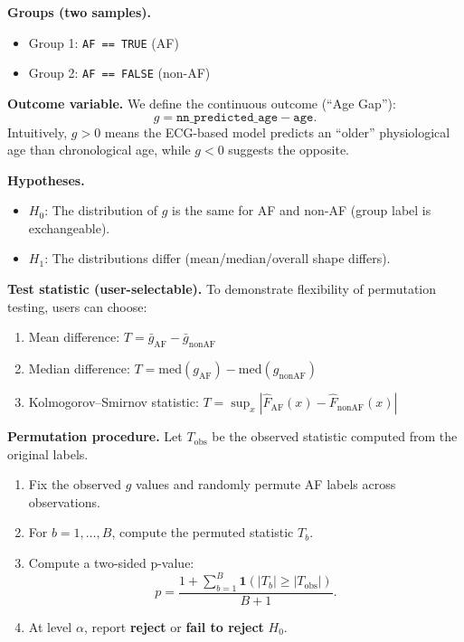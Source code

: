 \documentclass{article}
\begin{document}
\begin{normalsize}
    \vspace{0.5em}
    \noindent \textbf{Groups (two samples).}
    \begin{itemize}
        \item Group 1: \texttt{AF == TRUE} (AF)
        \item Group 2: \texttt{AF == FALSE} (non-AF)
    \end{itemize}

    \noindent \textbf{Outcome variable.} We define the continuous outcome (``Age Gap''):
    \[
        g = \texttt{nn\_predicted\_age} - \texttt{age}.
    \]
    Intuitively, $g>0$ means the ECG-based model predicts an ``older'' physiological age than chronological age, while $g<0$ suggests the opposite.

    \vspace{0.5em}
    \noindent \textbf{Hypotheses.}
    \begin{itemize}
        \item $H_{0}$: The distribution of $g$ is the same for AF and non-AF (group label is exchangeable).
        \item $H_{1}$: The distributions differ (mean/median/overall shape differs).
    \end{itemize}

    \noindent \textbf{Test statistic (user-selectable).} To demonstrate flexibility of permutation testing, users can choose:
    \begin{enumerate}
        \item Mean difference: $T = \bar g_{\text{AF}} - \bar g_{\text{nonAF}}$
        \item Median difference: $T = \mathrm{med}(g_{\text{AF}}) - \mathrm{med}(g_{\text{nonAF}})$
        \item Kolmogorov--Smirnov statistic: $T = \sup_{x} | \hat F_{\text{AF}}(x) - \hat F_{\text{nonAF}}(x) |$
    \end{enumerate}

    \noindent \textbf{Permutation procedure.} Let $T_{\text{obs}}$ be the observed statistic computed from the original labels.
    \begin{enumerate}
        \item Fix the observed $g$ values and randomly permute AF labels across observations.
        \item For $b=1,\dots,B$, compute the permuted statistic $T_b$.
        \item Compute a two-sided p-value:
        \[
            p = \frac{1 + \sum_{b=1}^{B} \mathbf{1}\left(|T_b| \ge |T_{\text{obs}}|\right)}{B+1}.
        \]
        \item At level $\alpha$, report \textbf{reject} or \textbf{fail to reject} $H_0$.
    \end{enumerate}


\end{normalsize}
\end{document}
